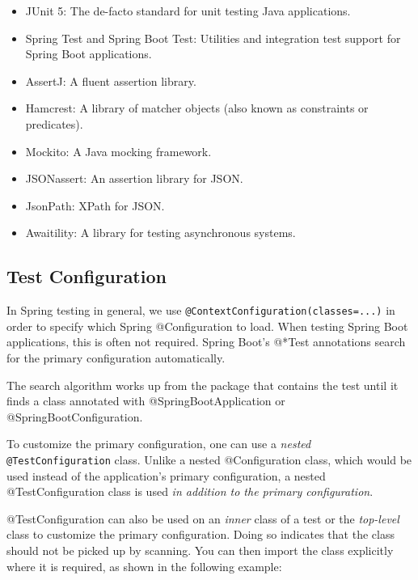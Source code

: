 \documentclass{scrartcl}
\begin{document}
\begin{itemize}
    \item JUnit 5: The de-facto standard for unit testing Java applications.

    \item Spring Test and Spring Boot Test: Utilities and integration test support for Spring Boot applications.

    \item AssertJ: A fluent assertion library.

    \item Hamcrest: A library of matcher objects (also known as constraints or predicates).

    \item Mockito: A Java mocking framework.

    \item JSONassert: An assertion library for JSON.

    \item JsonPath: XPath for JSON.

    \item Awaitility: A library for testing asynchronous systems.

\end{itemize}

\subsection{Test Configuration}

In Spring testing in general, we use \lstinline|@ContextConfiguration(classes=...)| in order to specify which Spring @Configuration to load.
When testing Spring Boot applications, this is often not required. Spring Boot’s @*Test annotations search for the primary configuration automatically.

The search algorithm works up from the package that contains the test until it finds a class annotated with @SpringBootApplication or @SpringBootConfiguration.

To customize the primary configuration, one can use a \textit{nested} \lstinline|@TestConfiguration| class. Unlike a nested @Configuration class, which would be used instead of the application’s primary configuration, a nested @TestConfiguration class is used \textit{in addition to the primary configuration}.

@TestConfiguration can also be used on an \textit{inner} class of a test or the \textit{top-level} class to customize the primary configuration. Doing so indicates that the class should not be picked up by scanning. You can then import the class explicitly where it is required, as shown in the following example:
\end{document}
